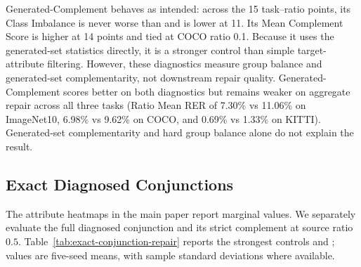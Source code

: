 Generated-Complement behaves as intended: across the 15 task--ratio points, its Class Imbalance is never worse than \model and is lower at 11. Its Mean Complement Score is higher at 14 points and tied at COCO ratio 0.1. Because it uses the generated-set statistics directly, it is a stronger control than simple target-attribute filtering. However, these diagnostics measure group balance and generated-set complementarity, not downstream repair quality. Generated-Complement scores better on both diagnostics but remains weaker on aggregate repair across all three tasks (Ratio Mean RER of 7.30\% vs 11.06\% on ImageNet10, 6.98\% vs 9.62\% on COCO, and 0.69\% vs 1.33\% on KITTI). Generated-set complementarity and hard group balance alone do not explain the \model result.

\subsection{Exact Diagnosed Conjunctions}

The attribute heatmaps in the main paper report marginal values. We separately evaluate the full diagnosed conjunction and its strict complement at source ratio $0.5$. Table~\ref{tab:exact-conjunction-repair} reports the strongest controls and \model; values are five-seed means, with sample standard deviations where available.

